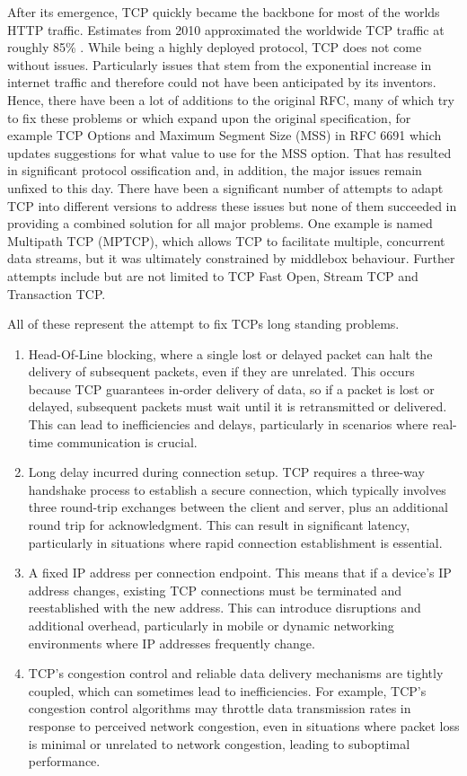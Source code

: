 After its emergence, TCP quickly became the backbone for most of the worlds HTTP traffic. Estimates from 2010 approximated the
worldwide TCP traffic at roughly 85\% \cite{tcp-adoption}. While being a highly deployed protocol, TCP does not come without issues.
Particularly issues that stem from the exponential increase in internet traffic and therefore could not have been anticipated by
its inventors. Hence, there have been a lot of additions to the original RFC, many of which try to fix these problems or which
expand upon the original specification, for example TCP Options and Maximum Segment Size (MSS) in RFC 6691\cite[]{rfc6691} which
updates suggestions for what value to use for the MSS option. That has resulted in significant protocol ossification and, in
addition, the major issues remain unfixed to this day. There have been a significant number of attempts to adapt TCP into different
versions to address these issues but none of them succeeded in providing a combined solution for all major problems. One example is
named Multipath TCP (MPTCP), which allows TCP to facilitate multiple, concurrent data streams, but it was ultimately constrained
by middlebox behaviour. Further attempts include but are not limited to TCP Fast Open, Stream TCP and Transaction TCP.

All of these represent the attempt to fix TCPs long standing problems.
\begin{enumerate}
 \item Head-Of-Line blocking, where a single lost or delayed packet can halt the delivery of subsequent packets, even if they are
 unrelated. This occurs because TCP guarantees in-order delivery of data, so if a packet is lost or delayed, subsequent packets
 must wait until it is retransmitted or delivered. This can lead to inefficiencies and delays, particularly in scenarios where
 real-time communication is crucial.
 \item Long delay incurred during connection setup. TCP requires a three-way handshake process to establish a secure connection, which
 typically involves three round-trip exchanges between the client and server, plus an additional round trip for acknowledgment.
 This can result in significant latency, particularly in situations where rapid connection establishment is essential.
 \item A fixed IP address per connection endpoint. This means that if a device's IP address changes, existing TCP connections must
 be terminated and reestablished with the new address. This can introduce disruptions and additional overhead, particularly in
 mobile or dynamic networking environments where IP addresses frequently change.
 \item TCP's congestion control and reliable data delivery mechanisms are tightly coupled, which can sometimes lead to
 inefficiencies. For example, TCP's congestion control algorithms may throttle data transmission rates in response to perceived
 network congestion, even in situations where packet loss is minimal or unrelated to network congestion, leading to suboptimal
 performance.
\end{enumerate}

